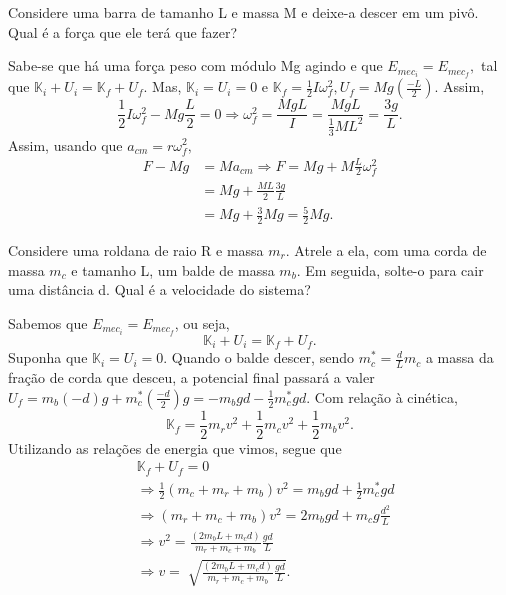 \documentclass[PhysicsII/physicsII_notes.tex]{subfiles}
\begin{document}
\begin{example}
	Considere uma barra de tamanho L e massa M e deixe-a descer em um pivô. Qual é a força que ele terá que fazer?

	Sabe-se que há uma força peso com módulo Mg agindo e que \(E_{mec_{i}} = E_{mec_{f}},\) tal que \(\mathbb{K}_{i} + U_{i} = \mathbb{K}_{f} + U_{f}\).
	Mas, \(\mathbb{K}_{i} = U_{i} = 0\) e \(\mathbb{K}_{f} = \frac{1}{2}I\omega_{f}^{2}, U_{f} = Mg(\frac{-L}{2}).\) Assim,
	\[
		\frac{1}{2}I\omega_{f}^{2} - Mg \frac{L}{2} = 0 \Rightarrow \omega_{f}^{2} = \frac{MgL}{I} = \frac{MgL}{\frac{1}{3}ML^{2}} = \frac{3g}{L}.
	\]
	Assim, usando que \(a_{cm} = r\omega_{f}^{2},\)
	\begin{align*}
		F- Mg & = Ma_{cm} \Rightarrow F = Mg + M \frac{L}{2}\omega_{f}^{2} \\
		      & = Mg + \frac{ML}{2}\frac{3g}{L}                            \\
		      & =Mg + \frac{3}{2}Mg = \frac{5}{2}Mg.
	\end{align*}
\end{example}
\begin{example}
	Considere uma roldana de raio R e massa \(m_{r}\). Atrele a ela, com uma corda de massa \(m_{c}\) e tamanho L, um balde de massa \(m_{b}\).
	Em seguida, solte-o para cair uma distância d. Qual é a velocidade do sistema?

	Sabemos que \(E_{mec_i} = E_{mec_f}\), ou seja,
	\[
		\mathbb{K}_{i} + U_{i} = \mathbb{K}_{f} + U_{f}.
	\]
	Suponha que \(\mathbb{K}_{i} = U_{i} = 0.\) Quando o balde descer, sendo \(m_{c}^{*} = \frac{d}{L}m_{c}\) a massa da fração de corda que desceu, a potencial final passará a valer
	\(U_{f} = m_{b}(-d)g + m_{c}^{*}(\frac{-d}{2})g = -m_{b}gd - \frac{1}{2}m_{c}^{*}gd.\) Com relação à cinética,
	\[
		\mathbb{K}_{f} = \frac{1}{2}m_{r}v^{2} + \frac{1}{2}m_{c}v^{2} + \frac{1}{2}m_{b}v^{2}.
	\]
	Utilizando as relações de energia que vimos, segue que
	\begin{align*}
		 & \mathbb{K}_{f} + U_{f} = 0                                                         \\
		 & \Rightarrow \frac{1}{2}(m_{c}+m_{r}+m_{b})v^{2} = m_{b}gd + \frac{1}{2}m_{c}^{*}gd \\
		 & \Rightarrow (m_{r}+m_{c}+m_{b})v^{2} = 2m_{b}gd + m_{c}g \frac{d^{2}}{L}           \\
		 & \Rightarrow v^{2} = \frac{(2m_{b}L + m_{c}d)}{m_{r}+m_{c}+m_{b}}\frac{gd}{L}       \\
		 & \Rightarrow v = \sqrt[]{\frac{(2m_{b}L + m_{c}d)}{m_{r}+m_{c}+m_{b}}\frac{gd}{L}}.
	\end{align*}
\end{example}
\end{document}
